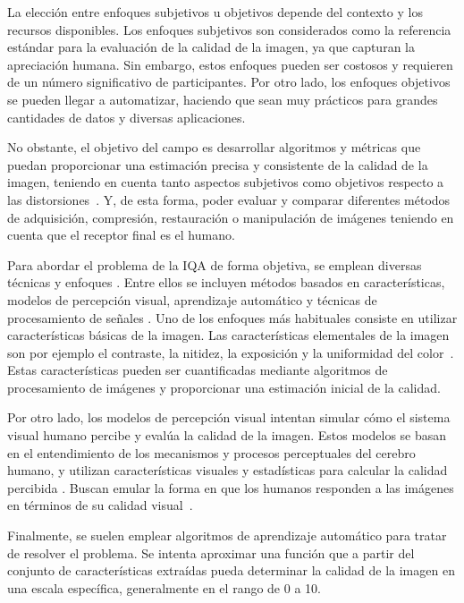 La elección entre enfoques subjetivos u objetivos depende del contexto y los 
recursos disponibles. Los enfoques subjetivos son considerados como la referencia estándar 
para la evaluación de la calidad de la imagen, ya que capturan la apreciación 
humana. Sin embargo, estos enfoques pueden ser costosos y requieren de un número 
significativo de participantes. 
Por otro lado, los enfoques objetivos se pueden llegar a automatizar, haciendo que 
sean muy prácticos para grandes cantidades de datos y diversas aplicaciones.
 
No obstante, el objetivo del campo es desarrollar algoritmos y métricas que puedan proporcionar una 
estimación precisa y consistente de la calidad de la imagen, teniendo en cuenta
tanto aspectos subjetivos como objetivos respecto a las distorsiones~\cite{SJTU}.
Y, de esta forma, poder evaluar y comparar diferentes métodos de adquisición, compresión, 
restauración o manipulación de imágenes teniendo en cuenta que el receptor 
final es el humano.
 
Para abordar el problema de la IQA de forma objetiva, se emplean diversas técnicas y enfoques
\cite{MinkowskiFailure, Wang2006ModernIQ, VisualMedicalQualityBook}.
Entre ellos se incluyen métodos basados en características,
modelos de percepción visual, aprendizaje automático y técnicas de procesamiento de señales
\cite{SSIM, MMF, DSS}.
Uno de los enfoques más habituales consiste en utilizar características básicas de la imagen. 
Las características elementales de la imagen son por ejemplo el contraste, 
la nitidez, la exposición y la uniformidad del color~\cite{MinkowskiFailure,Wang2006ModernIQ}. 
Estas características pueden ser cuantificadas mediante algoritmos de procesamiento de 
imágenes y proporcionar una estimación inicial de la calidad. 
 
Por otro lado, los modelos de percepción visual intentan simular cómo el sistema 
visual humano percibe y evalúa la calidad de la imagen. Estos modelos se basan 
en el entendimiento de los mecanismos y procesos perceptuales del cerebro humano, 
y utilizan características visuales y estadísticas para calcular la calidad percibida
\cite{MinkowskiFailure, SSIM}.
Buscan emular la forma en que los humanos responden 
a las imágenes en términos de su calidad visual~\cite{VSI, CascadedIQA}.
 
Finalmente, se suelen emplear algoritmos de aprendizaje automático para tratar
de resolver el problema. Se intenta aproximar una función que a partir del conjunto 
de características extraídas pueda determinar la calidad de la imagen en una escala 
específica, generalmente en el rango de 0 a 10.

